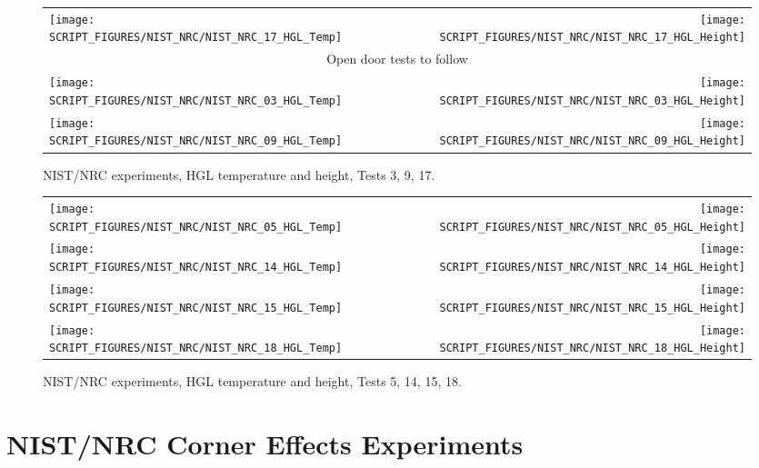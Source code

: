 \begin{figure}[p]
\begin{tabular*}{\textwidth}{l@{\extracolsep{\fill}}r}
\texttt{[image: SCRIPT\_FIGURES/NIST\_NRC/NIST\_NRC\_17\_HGL\_Temp]} &
\texttt{[image: SCRIPT\_FIGURES/NIST\_NRC/NIST\_NRC\_17\_HGL\_Height]} \\ [1.in]
\multicolumn{2}{c}{Open door tests to follow} \\ [1.in]
\texttt{[image: SCRIPT\_FIGURES/NIST\_NRC/NIST\_NRC\_03\_HGL\_Temp]} &
\texttt{[image: SCRIPT\_FIGURES/NIST\_NRC/NIST\_NRC\_03\_HGL\_Height]} \\
\texttt{[image: SCRIPT\_FIGURES/NIST\_NRC/NIST\_NRC\_09\_HGL\_Temp]} &
\texttt{[image: SCRIPT\_FIGURES/NIST\_NRC/NIST\_NRC\_09\_HGL\_Height]}
\end{tabular*}
\caption[NIST/NRC experiments, HGL temperature and height, Tests 3, 9, 17]
{NIST/NRC experiments, HGL temperature and height, Tests 3, 9, 17.}
\label{NIST_NRC_HGL_3}
\end{figure}

\begin{figure}[p]
\begin{tabular*}{\textwidth}{l@{\extracolsep{\fill}}r}
\texttt{[image: SCRIPT\_FIGURES/NIST\_NRC/NIST\_NRC\_05\_HGL\_Temp]} &
\texttt{[image: SCRIPT\_FIGURES/NIST\_NRC/NIST\_NRC\_05\_HGL\_Height]} \\
\texttt{[image: SCRIPT\_FIGURES/NIST\_NRC/NIST\_NRC\_14\_HGL\_Temp]} &
\texttt{[image: SCRIPT\_FIGURES/NIST\_NRC/NIST\_NRC\_14\_HGL\_Height]} \\
\texttt{[image: SCRIPT\_FIGURES/NIST\_NRC/NIST\_NRC\_15\_HGL\_Temp]} &
\texttt{[image: SCRIPT\_FIGURES/NIST\_NRC/NIST\_NRC\_15\_HGL\_Height]} \\
\texttt{[image: SCRIPT\_FIGURES/NIST\_NRC/NIST\_NRC\_18\_HGL\_Temp]} &
\texttt{[image: SCRIPT\_FIGURES/NIST\_NRC/NIST\_NRC\_18\_HGL\_Height]}
\end{tabular*}
\caption[NIST/NRC experiments, HGL temperature and height, Tests 5, 14, 15, 18]
{NIST/NRC experiments, HGL temperature and height, Tests 5, 14, 15, 18.}
\label{NIST_NRC_HGL_4}
\end{figure}


\clearpage

\section{NIST/NRC Corner Effects Experiments}

